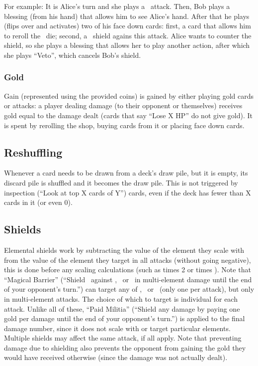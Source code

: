 \documentclass[dvipsnames,parskip,a4paper]{scrartcl}
\newcommand{\iconsize}{3.4mm}
\newcommand{\icondepth}{0.45mm}
\newcommand{\icon}[1]{\raisebox{-\icondepth}{\texttt{[image:  \#1 ]}}}
\newcommand{\fire}{\icon{icons/fire.png}}
\newcommand{\earth}{\icon{icons/earth.png}}
\newcommand{\water}{\icon{icons/water.png}}
\newcommand{\magic}{\icon{icons/magic.png}}
\begin{document}
For example: It is Alice's turn and she plays a \fire \ attack. Then, Bob plays a blessing (from his hand) that allows him to see Alice's hand. After that he plays (flips over and activates) two of his face down cards: first, a card that allows him to reroll the \fire \ die; second, a \water \ shield agains this attack. Alice wants to counter the shield, so she plays a blessing that allows her to play another action, after which she plays ``Veto'', which cancels Bob's shield.

\subsubsection*{Gold}

Gain (represented using the provided coins) is gained by either playing gold cards or attacks: a player dealing damage (to their opponent or themselves) receives gold equal to the damage dealt (cards that say ``Lose X HP'' do not give gold). It is spent by rerolling the shop, buying cards from it or placing face down cards.

\subsection*{Reshuffling}

Whenever a card needs to be drawn from a deck's draw pile, but it is empty, its discard pile is shuffled and it becomes the draw pile. This is not triggered by inspection (``Look at top X cards of Y'') cards, even if the deck has fewer than X cards in it (or even 0).

\subsection*{Shields}

Elemental shields work by subtracting the value of the element they scale with from the value of the element they target in all attacks (without going negative), this is done before any scaling calculations (such as times 2 or times \magic). Note that ``Magical Barrier'' (``Shield \magic \ against \fire, \earth \ or \water \ in multi-element damage until the end of your opponent's turn.'') can target any of \fire, \earth \ or \water \ (only one per attack), but only in multi-element attacks. The choice of which to target is individual for each attack. Unlike all of these, ``Paid Militia'' (``Shield any damage by paying one gold per damage until the end of your opponent's turn.'') is applied to the final damage number, since it does not scale with or target particular elements. Multiple shields may affect the same attack, if all apply. Note that preventing damage due to shielding also prevents the opponent from gaining the gold they would have received otherwise (since the damage was not actually dealt).
\end{document}
